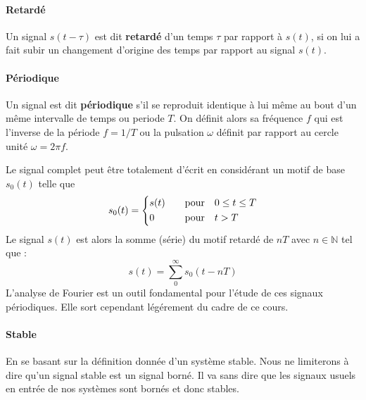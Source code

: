\paragraph{Retardé}
Un signal $s(t-\tau)$ est dit \textbf{retardé} d'un temps $\tau$ 
par rapport à $s(t)$, si on lui a fait subir un changement
d'origine des temps par rapport au signal $s(t)$.
\begin{center}

\end{center}

\paragraph{Périodique}
Un signal est dit \textbf{périodique} s'il se reproduit identique à lui
même au bout d'un même intervalle de temps ou periode $T$. On définit alors 
sa fréquence $f$ qui est l'inverse de la période $f=1/T$ ou la pulsation 
$\omega$ définit par rapport au cercle unité $\omega=2\pi f$.
{
\begin{figure}[!htb]
\centering
{}

\end{figure}
\setlength\intextsep{0pt}
}
Le signal complet peut être totalement d'écrit en considérant un motif de base 
$s_0(t)$ telle que
\begin{align*}
s_0(t) =
\begin{dcases}
    s(t)&\quad\text{pour}\quad 0\le t\le T   \\
    0&\quad\text{pour}\quad t>T
\end{dcases}
\end{align*}
Le signal $s(t)$ est alors la somme (série) du motif retardé de $nT$ 
avec $n\in\mathbb{N}$ tel que :
$$
s(t)=\sum_0^\infty s_0(t-nT)
$$
L'analyse de Fourier est un outil fondamental pour l'étude 
de ces signaux périodiques. Elle sort cependant légérement du cadre de 
ce cours.

\paragraph{Stable}
En se basant sur la définition donnée d'un système stable.
Nous ne limiterons à dire qu'un signal stable est un signal 
borné. Il va sans dire que les signaux usuels en entrée
de nos systèmes sont bornés et donc stables.

